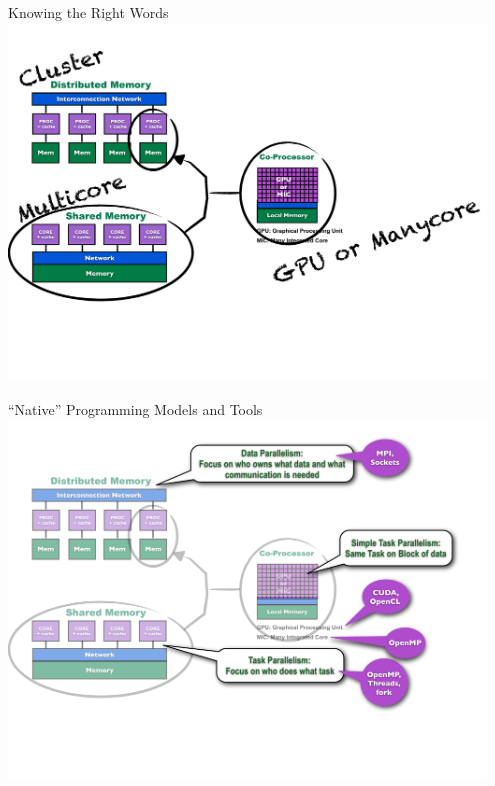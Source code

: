 \begin{frame}
\begin{block}{Knowing the Right Words}
    \includegraphics[width=0.95\textwidth]{../common/pics/ParallelHardware5.pdf}
\end{block}
\end{frame}

\begin{frame}
\begin{block}{``Native'' Programming Models and Tools}
    \includegraphics[width=0.95\textwidth]{../common/pics/ParallelHardware6.pdf}
\end{block}
\end{frame}

